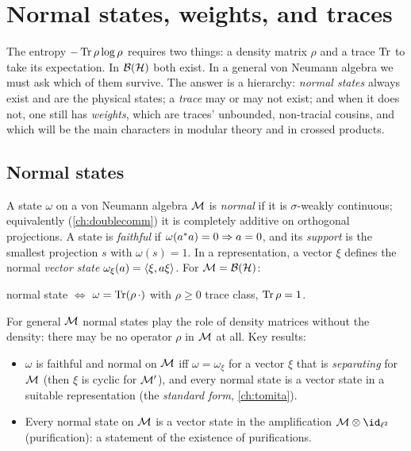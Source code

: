 \section{Normal states, weights, and traces}\label{ch:traces}

\begin{physmotiv}
The entropy $-\operatorname{Tr}\rho\log\rho$ requires two things: a density matrix $\rho$ and a trace $\operatorname{Tr}$ to take its expectation. In $\mathcal{B}(\mathcal{H})$ both exist. In a general von Neumann algebra we must ask which of them survive. The answer is a hierarchy: \emph{normal states} always exist and are the physical states; a \emph{trace} may or may not exist; and when it does not, one still has \emph{weights}, which are traces' unbounded, non-tracial cousins, and which will be the main characters in modular theory and in crossed products.
\end{physmotiv}

\subsection{Normal states}

A state $\omega$ on a von Neumann algebra $\mathcal{M}$ is \emph{normal} if it is $\sigma$-weakly continuous; equivalently (\cref{ch:doublecomm}) it is completely additive on orthogonal projections. A state is \emph{faithful} if $\omega(a^{*} a)=0\Rightarrow a=0$, and its \emph{support} is the smallest projection $s$ with $\omega(s)=1$. In a representation, a vector $\xi$ defines the normal \emph{vector state} $\omega_\xi(a)=\langle \xi,a\xi\rangle$. For $\mathcal{M}=\mathcal{B}(\mathcal{H})$:
\begin{center}
normal state $\Longleftrightarrow$ $\omega=\operatorname{Tr}(\rho\,\cdot)$ with $\rho\ge0$ trace class, $\operatorname{Tr}\rho=1$.
\end{center}
For general $\mathcal{M}$ normal states play the role of density matrices without the density: there may be no operator $\rho$ in $\mathcal{M}$ at all. Key results:
\begin{itemize}
\item $\omega$ is faithful and normal on $\mathcal{M}$ iff $\omega=\omega_\xi$ for a vector $\xi$ that is \emph{separating} for $\mathcal{M}$ (then $\xi$ is cyclic for $\mathcal{M}'$), and every normal state is a vector state in a suitable representation (the \emph{standard form}, \cref{ch:tomita}).
\item Every normal state on $\mathcal{M}$ is a vector state in the amplification $\M\otimes\id_{\ell^2}$ (purification): a statement of the existence of purifications.
\end{itemize}

